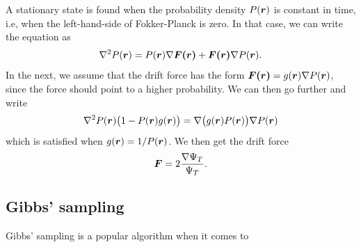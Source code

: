 A stationary state is found when the probability density $P(\boldsymbol{{r}})$ is constant in time, i.e, when the left-hand-side of Fokker-Planck is zero. In that case, we can write the equation as
\begin{equation}
\nabla^2P(\boldsymbol{{r}})=P(\boldsymbol{{r}})\nabla\boldsymbol{{F(\boldsymbol{{r}})}}+\boldsymbol{{F(\boldsymbol{{r}})}}\nabla P(\boldsymbol{{r}}).
\end{equation}
In the next, we assume that the drift force has the form $\boldsymbol{{F(\boldsymbol{{r}})}}=g(\boldsymbol{{r}})\nabla P(\boldsymbol{{r}})$, since the force should point to a higher probability. We can then go further and write
\begin{equation}
\nabla^2 P(\boldsymbol{{r}})\big(1-P(\boldsymbol{{r}})g(\boldsymbol{{r}})\big)=\nabla\big(g(\boldsymbol{{r}})P(\boldsymbol{{r}})\big)\nabla P(\boldsymbol{{r}})
\end{equation}
which is satisfied when $g(\boldsymbol{{r}})=1/P(\boldsymbol{{r}})$. We then get the drift force 
\begin{equation}
\boldsymbol{{F}}=2\frac{\nabla\Psi_T}{\Psi_T}.
\end{equation}

\subsection{Gibbs' sampling}
Gibbs' sampling is a popular algorithm when it comes to 